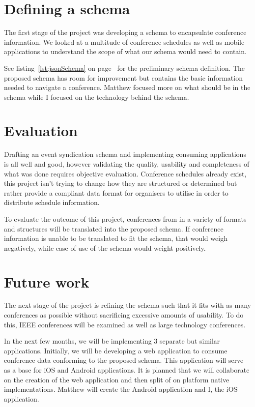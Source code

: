 \documentclass{article}
\begin{document}
\section{Defining a schema}
The first stage of the project was developing a schema to encapsulate conference information. We looked at a multitude of conference schedules as well as mobile applications to understand the scope of what our schema would need to contain.

See listing~\ref{lst:jsonSchema} on page~\pageref{lst:jsonSchema} for the preliminary schema definition. The proposed schema has room for improvement but contains the basic information needed to navigate a conference. Matthew focused more on what should be in the schema while I focused on the technology behind the schema.

\section{Evaluation}
Drafting an event syndication schema and implementing consuming applications is all well and good, however validating the quality, usability and completeness of what was done requires objective evaluation. Conference schedules already exist, this project isn't trying to change how they are structured or determined but rather provide a compliant data format for organisers to utilise in order to distribute schedule information.

To evaluate the outcome of this project, conferences from in a variety of formats and structures will be translated into the proposed schema. If conference information is unable to be translated to fit the schema, that would weigh negatively, while ease of use of the schema would weight positively.

\section{Future work}
The next stage of the project is refining the schema such that it fits with as many conferences as possible without sacrificing excessive amounts of usability. To do this, IEEE conferences will be examined as well as large technology conferences.

In the next few months, we will be implementing 3 separate but similar applications. Initially, we will be developing a web application to consume conference data conforming to the proposed schema. This application will serve as a base for iOS and Android applications. It is planned that we will collaborate on the creation of the web application and then split of on platform native implementations. Matthew will create the Android application and I, the iOS application.
\end{document}
